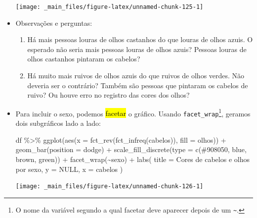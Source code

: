 \documentclass[
  11pt]{report}
\newenvironment{Shaded}{\begin{snugshade}}{\end{snugshade}}
\newcommand{\AttributeTok}[1]{\textcolor[rgb]{0.77,0.63,0.00}{#1}}
\newcommand{\ConstantTok}[1]{\textcolor[rgb]{0.00,0.00,0.00}{#1}}
\newcommand{\FunctionTok}[1]{\textcolor[rgb]{0.00,0.00,0.00}{#1}}
\newcommand{\NormalTok}[1]{#1}
\newcommand{\SpecialCharTok}[1]{\textcolor[rgb]{0.00,0.00,0.00}{#1}}
\newcommand{\StringTok}[1]{\textcolor[rgb]{0.31,0.60,0.02}{#1}}
\renewenvironment{Shaded}{
    \begin{mdframed}[%
      roundcorner=2pt,%
      innerleftmargin=5pt,%
      innerrightmargin=5pt,%
      topline=true,%
      leftline=true,%
      rightline=true,%
      bottomline=true,%
      linewidth=0.5pt,%
      linecolor=black!20,%
      backgroundcolor=black!2,%
      skipabove=2ex,%
      skipbelow=2.5ex%
    ]%
  }
  {
    \end{mdframed}
  }
\begin{document}
\begin{itemize}
  \begin{center}\texttt{[image: \_main\_files/figure-latex/unnamed-chunk-125-1]} \end{center}
\item
  Observações e perguntas:

  \begin{enumerate}
  \def\labelenumi{\arabic{enumi}.}
  \item
    Há mais pessoas louras de olhos castanhos do que louras de olhos azuis. O esperado não seria mais pessoas louras de olhos azuis? Pessoas louras de olhos castanhos pintaram os cabelos?
  \item
    Há muito mais ruivos de olhos azuis do que ruivos de olhos verdes. Não deveria ser o contrário? Também são pessoas que pintaram os cabelos de ruivo? Ou houve erro no registro das cores dos olhos?
  \end{enumerate}
\item
  Para incluir o sexo, podemos {\hl{facetar}} o gráfico. Usando \texttt{facet\_wrap}\footnote{O nome da variável segundo a qual facetar deve aparecer depois de um \texttt{\textasciitilde{}}.}, geramos dois subgráficos lado a lado:

\begin{Shaded}
\begin{Highlighting}[]
\NormalTok{df }\SpecialCharTok{\%\textgreater{}\%} 
  \FunctionTok{ggplot}\NormalTok{(}\FunctionTok{aes}\NormalTok{(}\AttributeTok{x =} \FunctionTok{fct\_rev}\NormalTok{(}\FunctionTok{fct\_infreq}\NormalTok{(cabelos)), }\AttributeTok{fill =}\NormalTok{ olhos)) }\SpecialCharTok{+}
    \FunctionTok{geom\_bar}\NormalTok{(}\AttributeTok{position =} \StringTok{\textquotesingle{}dodge\textquotesingle{}}\NormalTok{) }\SpecialCharTok{+}
    \FunctionTok{scale\_fill\_discrete}\NormalTok{(}\AttributeTok{type =} \FunctionTok{c}\NormalTok{(}\StringTok{\textquotesingle{}\#908050\textquotesingle{}}\NormalTok{, }\StringTok{\textquotesingle{}blue\textquotesingle{}}\NormalTok{, }\StringTok{\textquotesingle{}brown\textquotesingle{}}\NormalTok{, }\StringTok{\textquotesingle{}green\textquotesingle{}}\NormalTok{)) }\SpecialCharTok{+}
    \FunctionTok{facet\_wrap}\NormalTok{(}\SpecialCharTok{\textasciitilde{}}\NormalTok{sexo) }\SpecialCharTok{+}
    \FunctionTok{labs}\NormalTok{(}
      \AttributeTok{title =} \StringTok{\textquotesingle{}Cores de cabelos e olhos por sexo\textquotesingle{}}\NormalTok{,}
      \AttributeTok{y =} \ConstantTok{NULL}\NormalTok{,}
      \AttributeTok{x =} \StringTok{\textquotesingle{}cabelos\textquotesingle{}}
\NormalTok{    )}
\end{Highlighting}
\end{Shaded}

  \begin{center}\texttt{[image: \_main\_files/figure-latex/unnamed-chunk-126-1]} \end{center}
\end{itemize}
\end{document}
